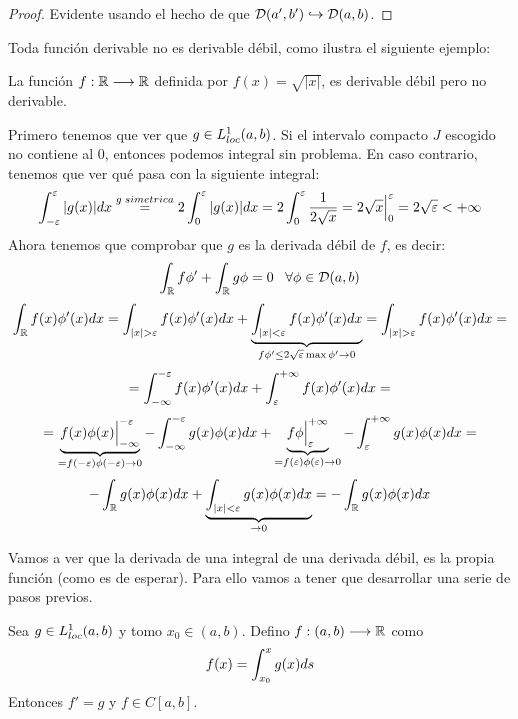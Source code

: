 \begin{proof}
Evidente usando el hecho de que $\mathcal{D}(a',b')\hookrightarrow\mathcal{D}(a,b)$.
\end{proof}

Toda función derivable no es derivable débil, como ilustra el siguiente ejemplo:

\begin{example}
La función $f : \mathbb{R} \longrightarrow \mathbb{R}$ definida por $f(x)=\sqrt{|x|}$, es derivable débil pero no derivable.

Primero tenemos que ver que $g\in L^1_{loc}(a,b)$. Si el intervalo compacto $J$ escogido no contiene al 0, entonces podemos integral sin problema. En caso contrario, tenemos que ver qué pasa con la siguiente integral:
\[
\displaystyle\int_{ -\varepsilon }^{ \varepsilon } |g(x)|dx\overset{g\; simetrica}{=}2\displaystyle\int_{ 0 }^{ \varepsilon } |g(x)|dx=2\displaystyle\int_{ 0 }^{ \varepsilon } \frac{1}{2\sqrt{x}}=2\sqrt{x}\Big|_0^\varepsilon=2\sqrt{\varepsilon}<+\infty
\]
Ahora tenemos que comprobar que $g$ es la derivada débil de $f$, es decir:
\[
\displaystyle\int_{ \mathbb{R} }^{  } f\phi'+\displaystyle\int_{ \mathbb{R} }^{  } g\phi=0 \;\;\; \forall\phi\in\mathcal{D}(a,b)
\]
\[
\integral{\R}{}{f(x)\phi'(x)dx}=\integral{|x|>\varepsilon}{}{f(x)\phi'(x)dx}+\underbrace{\integral{|x|<\varepsilon}{}{f(x)\phi'(x)dx}}_{f\phi'\leq2\sqrt{\varepsilon}\max\phi'\to0}=\integral{|x|>\varepsilon}{}{f(x)\phi'(x)dx}=
\]
\[
=\displaystyle\int_{ -\infty }^{ -\varepsilon } f(x)\phi'(x)dx+\displaystyle\int_{ \varepsilon }^{ +\infty } f(x)\phi'(x)dx=
\]
\[
=\underbrace{f(x)\phi(x)\Big|_{-\infty}^{-\varepsilon}}_{=f(-\varepsilon)\phi(-\varepsilon)\to 0}-
\displaystyle\int_{ -\infty }^{ -\varepsilon } g(x)\phi(x) dx+
\underbrace{f\phi\Big|_{\varepsilon}^{+\infty}}_{{=f(\varepsilon)\phi(\varepsilon)\to 0}}-
\displaystyle\int_{ \varepsilon }^{ +\infty } g(x)\phi(x) dx=
\]
\[
-\displaystyle\int_{ \mathbb{R} }^{  } g(x)\phi(x)dx+\underbrace{\displaystyle\int_{ |x|<\varepsilon }^{  } g(x)\phi(x)dx}_{\to0}=-\displaystyle\int_{ \mathbb{R} }^{  } g(x)\phi(x)dx
\]
\end{example}

Vamos a ver que la derivada de una integral de una derivada débil, es la propia función (como es de esperar). Para ello vamos a tener que desarrollar una serie de pasos previos.

\begin{theorem}
\label{fundamentalcalculo}
Sea $g\in L^1_{loc}(a,b)$ y tomo $x_0\in(a,b)$. Defino $f : (a,b) \longrightarrow \mathbb{R}$ como
\[
f(x)=\displaystyle\int_{ x_0 }^{ x } g(x)ds
\]
Entonces $f'=g$ y $f\in C[a,b]$.
\end{theorem}

